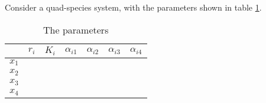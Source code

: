 Consider a quad-species system, with the parameters shown in table \ref{tb:quad-para}.

\begin{table}
    \begin{center}
        \caption{The parameters}
        \begin{tabular}{c|cccccc}
            \toprule
                  & $r_i$ & $K_i$ & $\alpha_{i1}$ & $\alpha_{i2}$ & $\alpha_{i3}$ & $\alpha_{i4}$ \\
            \midrule
            $x_1$ &       &       &               &               &               &               \\
            $x_2$ &       &       &               &               &               &               \\
            $x_3$ &       &       &               &               &               &               \\
            $x_4$ &       &       &               &               &               &               \\
            \bottomrule
        \end{tabular}\label{tb:quad-para}
    \end{center}
\end{table}



